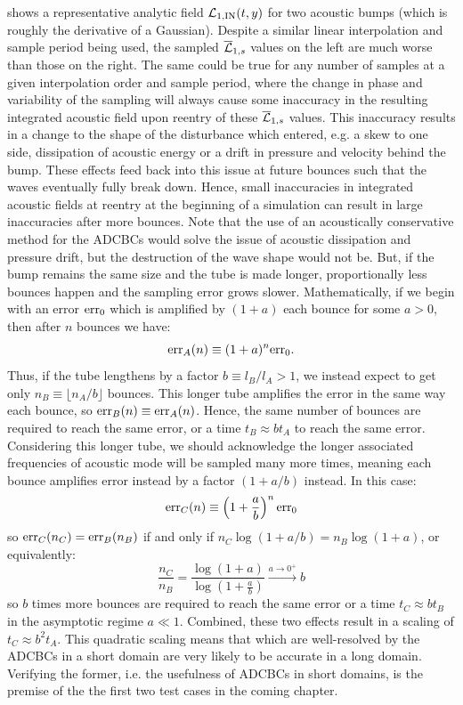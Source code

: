  shows a representative analytic field $\cl{L}_{1, \rm{IN}}(t, y)$ for two acoustic bumps (which is roughly the derivative of a Gaussian). Despite a similar linear interpolation and sample period being used, the sampled $\overline{\cl{L}}_{1, s}$ values on the left are much worse than those on the right. The same could be true for any number of samples at a given interpolation order and sample period, where the change in phase and variability of the sampling will always cause some inaccuracy in the resulting integrated acoustic field upon reentry of these $\overline{\cl{L}}_{1, s}$ values. This inaccuracy results in a change to the shape of the disturbance which entered, e.g. a skew to one side, dissipation of acoustic energy or a drift in pressure and velocity behind the bump. These effects feed back into this issue at future bounces such that the waves eventually fully break down. Hence, small inaccuracies in integrated acoustic fields at reentry at the beginning of a simulation can result in large inaccuracies after more bounces. Note that the use of an acoustically conservative method for the ADCBCs would solve the issue of acoustic dissipation and pressure drift, but the destruction of the wave shape would not be. But, if the bump remains the same size and the tube is made longer, proportionally less bounces happen and the sampling error grows slower. Mathematically, if we begin with an error $\rm{err}_0$ which is amplified by $(1 + a)$ each bounce for some $a > 0$, then after $n$ bounces we have:
\begin{equation}
\rm{err}_A(n) \equiv (1 + a)^{n} \rm{err}_0.
\end{equation}
Thus, if the tube lengthens by a factor $b \equiv l_B / l_A > 1$, we instead expect to get only $n_B \equiv \lfloor n_A / b \rfloor$ bounces. This longer tube amplifies the error in the same way each bounce, so $\rm{err}_B(n) \equiv \rm{err}_A(n)$. Hence, the same number of bounces are required to reach the same error, or a time $t_B \approx b t_A$ to reach the same error. Considering this longer tube, we should acknowledge the longer associated frequencies of acoustic mode will be sampled many more times, meaning each bounce amplifies error instead by a factor $(1 + a / b)$ instead. In this case:
\begin{equation}
\rm{err}_C(n) \equiv \left( 1 + \frac{a}{b} \right)^n \rm{err}_0
\end{equation}
so $\rm{err}_C(n_C) = \rm{err}_B(n_B)$ if and only if $n_C \log(1 + a / b) = n_B \log(1 + a)$, or equivalently:
\begin{equation}
\frac{n_C}{n_B} = \frac{\log\left(1 + a\right)}{\log(1 + \frac{a}{b})} \xrightarrow{a \to 0^+} b
\end{equation}
so $b$ times more bounces are required to reach the same error or a time $t_C \approx b t_B$ in the asymptotic regime $a \ll 1$. Combined, these two effects result in a scaling of $t_C \approx b^2 t_A$. This quadratic scaling means that which are well-resolved by the ADCBCs in a short domain are very likely to be accurate in a long domain. Verifying the former, i.e. the usefulness of ADCBCs in short domains, is the premise of the the first two test cases in the coming chapter.



